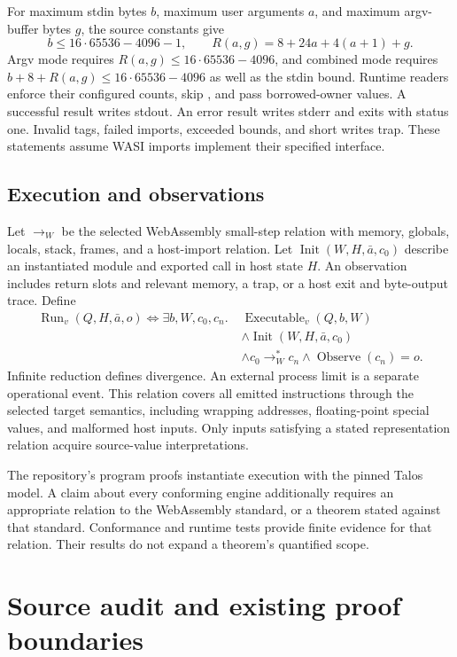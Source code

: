 \documentclass[11pt]{article}
\newcommand{\code}[1]{\texttt{\seqsplit{#1}}}
\begin{document}
For maximum stdin bytes $b$, maximum user arguments $a$, and maximum argv-buffer bytes $g$, the source constants give
\[
b\le16\cdot65536-4096-1,
\qquad R(a,g)=8+24a+4(a+1)+g.
\]
Argv mode requires $R(a,g)\le16\cdot65536-4096$, and combined mode requires $b+8+R(a,g)\le16\cdot65536-4096$ as well as the stdin bound.  Runtime readers enforce their configured counts, skip \code{argv[0]}, and pass borrowed-owner values.  A successful result writes stdout.  An error result writes stderr and exits with status one.  Invalid tags, failed imports, exceeded bounds, and short writes trap.  These statements assume WASI imports implement their specified interface.

\subsection{Execution and observations}

Let $\longrightarrow_W$ be the selected WebAssembly small-step relation with memory, globals, locals, stack, frames, and a host-import relation.  Let $\operatorname{Init}(W,H,\bar a,c_0)$ describe an instantiated module and exported call in host state $H$.  An observation includes return slots and relevant memory, a trap, or a host exit and byte-output trace.  Define
\begin{align*}
\operatorname{Run}_v(Q,H,\bar a,o)\iff\exists b,W,c_0,c_n.\;&
\operatorname{Executable}_v(Q,b,W)\\
&\land\operatorname{Init}(W,H,\bar a,c_0)\\
&\land c_0\longrightarrow_W^*c_n
\land\operatorname{Observe}(c_n)=o.
\end{align*}
Infinite reduction defines divergence.  An external process limit is a separate operational event.  This relation covers all emitted instructions through the selected target semantics, including wrapping addresses, floating-point special values, and malformed host inputs.  Only inputs satisfying a stated representation relation acquire source-value interpretations.

The repository's program proofs instantiate execution with the pinned Talos model.  A claim about every conforming engine additionally requires an appropriate relation to the WebAssembly standard, or a theorem stated against that standard.  Conformance and runtime tests provide finite evidence for that relation.  Their results do not expand a theorem's quantified scope.

\section{Source audit and existing proof boundaries}
\label{sec:audit}
\end{document}

